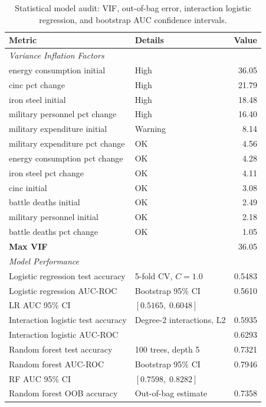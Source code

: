 \begin{table}[H]
\centering
\caption{Statistical model audit: VIF, out-of-bag error, interaction logistic regression, and bootstrap AUC confidence intervals.}
\label{tab:statistical_audit}
\small
\setlength{\tabcolsep}{4pt}
\begin{tabularx}{\textwidth}{@{}l X r@{}}
\toprule
\textbf{Metric} & \textbf{Details} & \textbf{Value} \\
\midrule
\multicolumn{3}{l}{\textit{Variance Inflation Factors}} \\
energy consumption initial & High & 36.05 \\
cinc pct change & High & 21.79 \\
iron steel initial & High & 18.48 \\
military personnel pct change & High & 16.40 \\
military expenditure initial & Warning & 8.14 \\
military expenditure pct change & OK & 4.56 \\
energy consumption pct change & OK & 4.28 \\
iron steel pct change & OK & 4.11 \\
cinc initial & OK & 3.08 \\
battle deaths initial & OK & 2.49 \\
military personnel initial & OK & 2.18 \\
battle deaths pct change & OK & 1.05 \\
\midrule
\multicolumn{2}{l}{\textbf{Max VIF}} & 36.05 \\
\midrule
\multicolumn{3}{l}{\textit{Model Performance}} \\
Logistic regression test accuracy & 5-fold CV, $C=1.0$ & 0.5483 \\
Logistic regression AUC-ROC & Bootstrap 95\% CI & 0.5610 \\
  LR AUC 95\% CI & $[0.5165,\; 0.6048]$ & \\
Interaction logistic test accuracy & Degree-2 interactions, L2 & 0.5935 \\
Interaction logistic AUC-ROC & & 0.6293 \\
Random forest test accuracy & 100 trees, depth 5 & 0.7321 \\
Random forest AUC-ROC & Bootstrap 95\% CI & 0.7946 \\
  RF AUC 95\% CI & $[0.7598,\; 0.8282]$ & \\
Random forest OOB accuracy & Out-of-bag estimate & 0.7358 \\
\bottomrule
\end{tabularx}
\end{table}
